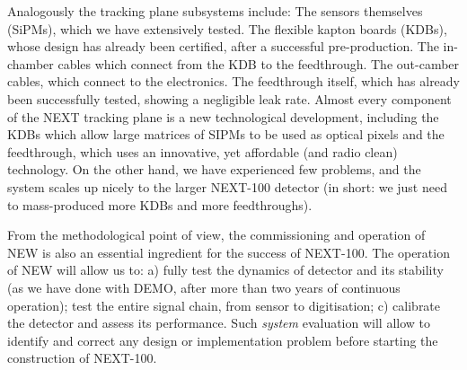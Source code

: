 Analogously the tracking plane subsystems include: The sensors themselves (SiPMs), which we have extensively tested. The flexible kapton boards (KDBs), whose design has already been certified, after a successful pre-production. The in-chamber cables which connect from the KDB to the feedthrough. The out-camber cables, which connect to the electronics. The feedthrough itself, which has already been successfully tested, showing a negligible leak rate. Almost every component of the NEXT tracking plane is a new technological development, including the KDBs which allow large matrices of SIPMs to be used as optical pixels and the feedthrough, which uses an innovative, yet affordable (and radio clean) technology. On the other hand, we have experienced few problems, and the system scales up nicely to the larger NEXT-100 detector (in short: we just need to mass-produced more KDBs and more feedthroughs). 

From the methodological point of view, the commissioning and operation of NEW is also an essential ingredient for the success of NEXT-100. The operation of NEW will allow us to: a) fully test the dynamics of detector and its stability (as we have done with DEMO, after more than two years of continuous operation); test the entire signal chain, from sensor to digitisation; c) calibrate the detector and assess its performance. Such {\em system} evaluation will allow to identify and correct any design or implementation problem before starting the construction of NEXT-100. 

